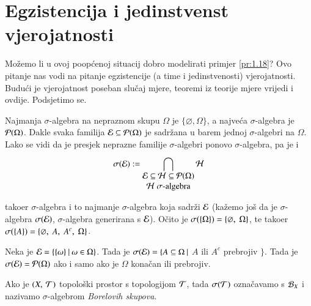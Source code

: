 
\chapter{Egzistencija i jedinstvenst vjerojatnosti}

Mo\v zemo li u ovoj poop\' cenoj situacij dobro modelirati primjer
\ref{pr:1.18}? Ovo pitanje nas vodi na pitanje egzistencije
(a time i jedinstvenosti) vjerojatnosti. Budu\' ci je vjerojatnost
poseban slu\v caj mjere, teoremi iz teorije mjere vrijedi i ovdije.
Podsjetimo se.

Najmanja $\sigma$-algebra na nepraznom skupu $\Omega$ je
$\{\varnothing, \Omega\}$, a najve\' ca $\sigma$-algebra je
$\mathcal{P}({\Omega})$.
Dakle svaka familija $\mathcal{E} \subseteq \mathcal{P}({\Omega})$ je sadr\v zana
u barem jednoj $\sigma$-algebri na $\Omega$.
Lako se vidi da je presjek neprazne familije $\sigma$-algebri ponovo
$\sigma$-algebra, pa je i
\begin{equation} \label{jed:2.1}
    \sigAlg{\E} := \presjek{\shortstack{$\E \subseteq \hh \subseteq
    \partitive{\Omega}$ \\ $\hh$ $\sigma$-algebra}}{} 
        \hh
\end{equation}

tako\dj er $\sigma$-algebra i to najmanje $\sigma$-algebra koja
sadr\v zi $\mathcal{E}$ (ka\v zemo jo\v s da je $\sigma$-algebra
$\sigma({\mathcal{E}})$, $\sigma$-algebra generirana s $\mathcal{E}$).
O\v cito je $\sigma({\{\Omega\}}) = \{ \varnothing, \; \Omega\}$,
te tako\dj er
$\sigma({\{A\}}) = \{ \varnothing, \; A, \; A^c, \; \Omega \}$.

\begin{zad} \label{zad:2.2}
    Neka je $\mathcal{E} = \{{\{ \omega \}} \: | \: {\omega \in \Omega}\}$.
    Tada je $\sigma({\mathcal{E}}) =\{ A \subseteq \Omega \: |$ $A$ ili $A^c$
    prebrojiv $\}$. Tada je $\sigma({\mathcal{E}}) = \mathcal{P}({\Omega})$ ako
    i samo ako je $\Omega$ kona\v can ili prebrojiv.
\end{zad}

%
%

Ako je $(X, \: \mathcal{T})$ topolo\v ski prostor s topologijom $\mathcal{T}$, tada
$\sigma({\mathcal{T}})$ ozna\v cavamo s $\mathcal{B}_{X}$ i nazivamo
$\sigma$-algebrom \emph{Borelovih skupova}.

